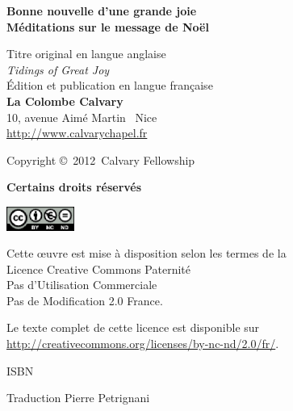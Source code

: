 \newpage
\mbox{}
\vfill

{\scriptsize

\textbf{Bonne nouvelle d'une grande joie\\
 Méditations sur le message de No\"el}

Titre original en langue anglaise\frcolon{}\\
\emph{Tidings of Great Joy} \\

Édition et publication en langue fran\c{c}aise\frcolon{}\\
 {\bfseries La Colombe Calvary}\\
 10, avenue Aimé Martin ~Nice\\
 \url{http://www.calvarychapel.fr}

Copyright \copyright{}~2012~Calvary Fellowship

{\bfseries Certains droits réservés}

\includegraphics[width=6em]{by-nc-nd_eu}

Cette \oe{}uvre est mise à disposition selon les termes de la \\
 Licence Creative Commons Paternité \\
 \ocadr Pas d'Utilisation Commerciale \\
 \ocadr Pas de Modification 2.0 France.

Le texte complet de cette licence est disponible sur \\
 \url{http://creativecommons.org/licenses/by-nc-nd/2.0/fr/}.

ISBN~\isbn

Traduction\frcolon{} Pierre Petrignani


}

